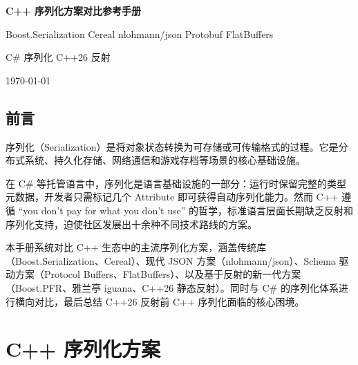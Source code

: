 \documentclass[12pt,a4paper,fontset=fandol]{ctexbook}
\begin{document}
\begin{titlepage}
\centering
\vspace*{3cm}
{\Huge\bfseries\color{algheadbg} C++ 序列化方案对比参考手册\par}
\vspace{1cm}
{\LARGE\color{blue!70!black} Boost.Serialization \textbullet{} Cereal \textbullet{} nlohmann/json \textbullet{} Protobuf \textbullet{} FlatBuffers\par}
\vspace{0.3cm}
{\LARGE\color{blue!70!black} C\# 序列化 \textbullet{} C++26 反射\par}
\vfill
{\large\color{gray} \today\par}
\end{titlepage}

\frontmatter

\chapter*{前言}

序列化（Serialization）是将对象状态转换为可存储或可传输格式的过程。它是分布式系统、持久化存储、网络通信和游戏存档等场景的核心基础设施。

在 C\# 等托管语言中，序列化是语言基础设施的一部分：运行时保留完整的类型元数据，开发者只需标记几个 Attribute 即可获得自动序列化能力。然而 C++ 遵循 ``you don't pay for what you don't use'' 的哲学，标准语言层面长期缺乏反射和序列化支持，迫使社区发展出十余种不同技术路线的方案。

本手册系统对比 C++ 生态中的主流序列化方案，涵盖传统库（Boost.Serialization、Cereal）、现代 JSON 方案（nlohmann/json）、Schema 驱动方案（Protocol Buffers、FlatBuffers）、以及基于反射的新一代方案（Boost.PFR、雅兰亭 iguana、C++26 静态反射）。同时与 C\# 的序列化体系进行横向对比，最后总结 C++26 反射前 C++ 序列化面临的核心困境。

\makeatletter
{}
\makeatother

\mainmatter

\part{C++ 序列化方案}
\end{document}
